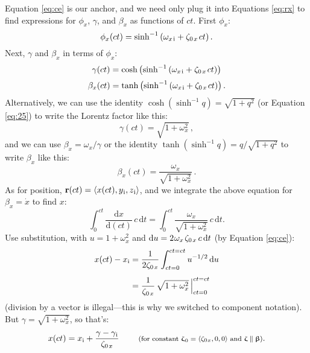 \documentclass[12pt]{article}
\renewcommand{\vv}[1]{\mathbf{#1}}
\newcommand{\dd}[1]{\mathrm{d}#1}
\newcommand{\vvbeta}{\bm{\upbeta}}
\newcommand{\vvzeta}{\bm{\upzeta}}
\begin{document}
Equation \ref{eq:ce} is our anchor, and we need only plug it into Equations \ref{eq:rx} to find expressions for $\phi_x$, $\gamma$, and $\beta_x$ as functions of $ct$. First $\phi_x$:
\begin{equation*}
\phi_x (ct) = \sinh^{-1} \left( \omega_{x \mkern2mu \textrm{i}} + \zeta_{0 \mkern2mu x} \mkern2mu ct \right) .
\end{equation*}
Next, $\gamma$ and $\beta_x$ in terms of $\phi_x$:
\begin{equation*}
\gamma (ct) = \cosh \left( \sinh^{-1} \left( \omega_{x \mkern2mu \textrm{i}} + \zeta_{0 \mkern2mu x} \mkern2mu ct \right)  \right)
\end{equation*}
\begin{equation*}
\beta_x (ct) = \tanh \left( \sinh^{-1} \left( \omega_{x \mkern2mu \textrm{i}} + \zeta_{0 \mkern2mu x} \mkern2mu ct \right) \right).
\end{equation*}
Alternatively, we can use the identity $\cosh{(\sinh^{-1} q) = \sqrt{1 + q^2}}$ (or Equation \ref{eq:25}) to write the Lorentz factor like this:
\begin{equation*}
\gamma (ct) = \sqrt{1 + \omega^2_x} \, ,
\end{equation*}
and we can use $\beta_x = \omega_x / \gamma$ or the identity $\tanh{(\sinh^{-1} q)} = q / \sqrt{1 + q^2}$ to write $\beta_x$ like this:
\begin{equation*}
\beta_x (ct) = \dfrac{\omega_x}{\sqrt{1 + \omega^2_x}} \, .
\end{equation*}
As for position, $\vv r (ct) = \langle x (ct) , y_{\mkern1mu \mathrm{i}}, z_{\mkern1mu \mathrm{i}} \rangle$, and we integrate the above equation for $\beta_x = \dot{x}$ to find $x$:
\begin{equation*}
\int_0^{ct} \dfrac{\dd x}{\dd (ct)} \, c \, \dd t = \int_0^{ct} \dfrac{\omega_x}{\sqrt{1 + \omega^2_x}} \, c \, \dd t .
\end{equation*}
Use substitution, with $u = 1 + \omega^2_x$ and $\dd u = 2 \mkern1mu \omega_x \mkern2mu \zeta_{0 \mkern2mu x} \, c \, \dd t$ (by Equation \ref{eq:ce}):
\begin{equation*}
\begin{split}
x (ct) - x_{\mathrm{i}} &= \dfrac{1}{2 \zeta_{0 \mkern2mu x}} \int_{ct = 0}^{ct = ct} u^{-1/2} \, \dd u \\[5pt]
&= \dfrac{1}{ \zeta_{0 \mkern2mu x}} \, \sqrt{1 + \omega^2_x } \, \Big \vert^{ct = ct}_{ct = 0}
\end{split}
\end{equation*}
(division by a vector is illegal---this is why we switched to component notation). But $\gamma = \sqrt{1 + \omega^2_x}$, so that's:
\begin{equation}\label{eq:x}
x (ct) = x_{\mathrm{i}} + \dfrac{ \gamma - \gamma_{\mkern1mu \mathrm{i}} }{ \zeta_{0 \mkern2mu x}} \qquad \textrm{\footnotesize{ (for constant $\vvzeta_{\mkern1mu 0} = \langle \zeta_{0 \mkern1mu x} , 0, 0 \rangle$ and $\vvzeta \parallel \vvbeta$)}}.
\end{equation}
\end{document}
